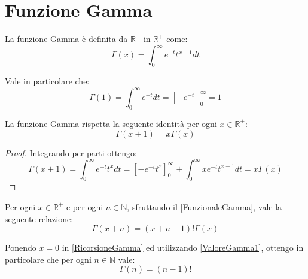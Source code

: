 \section{Funzione Gamma}

\begin{definition}\label{FunzioneGamma} 
	La funzione Gamma è definita da $\mathbb{R^+}$ in $\mathbb{R^+}$ come:
	\begin{equation*}
		\Gamma(x)=\int_0^{\infty}{e^{-t}t^{x-1}dt}
	\end{equation*}
\end{definition}

\begin{remark}\label{ValoreGamma1}
Vale in particolare che:
 \begin{equation*}
       \Gamma(1)=\int_0^{\infty}{e^{-t}dt}=\left[-e^{-t}\right]_0^{\infty}=1
       \end{equation*}
\end{remark}


\begin{lemma}\label{FunzionaleGamma}
 La funzione Gamma rispetta la seguente identità per ogni $x\in\mathbb{R^+}$:
 \begin{equation*}
  \Gamma(x+1)=x\Gamma(x)
 \end{equation*}
\end{lemma}
\begin{proof}
   Integrando per parti ottengo:
       \begin{equation*} 
       \Gamma(x+1)=\int_0^{\infty}{e^{-t}t^xdt}=\left[-e^{-t}t^x\right]_0^{\infty}+\int_0^{\infty}xe^{-t}t^{x-1}dt=x\Gamma(x)
       \end{equation*}
 \end{proof}
 
  \begin{remark} \label{RicorsioneGamma}
  Per ogni $x\in\mathbb{R^+}$ e per ogni $n\in\mathbb{N}$, sfruttando il \cref{FunzionaleGamma}, vale la seguente relazione:
  \begin{equation}
   \Gamma(x+n)=(x+n-1)!\Gamma(x)
  \end{equation}
 \end{remark}
 
 \begin{remark} \label{ValoreGammaNaturali}
  Ponendo $x=0$ in \cref{RicorsioneGamma} ed utilizzando \cref{ValoreGamma1}, ottengo in particolare che per ogni $n\in\mathbb{N}$ vale:
  \begin{equation}
   \Gamma(n)=(n-1)!
  \end{equation}
 \end{remark}


